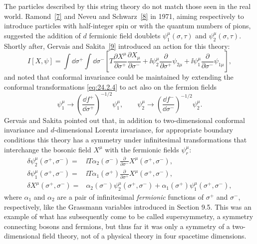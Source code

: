 The particles described by this string theory do not match those seen in the
real world. Ramond~\hyperref[ch24-ref-7]{[7]} and Neveu and
Schwarz~\hyperref[ch24-ref-8]{[8]} in 1971, aiming respectively to introduce
particles with half-integer spin or with the quantum numbers of pions,
suggested the addition of \(d\) fermionic field doublets
\(\psi_1^\mu(\sigma,\tau)\) and \(\psi_2^\mu(\sigma,\tau)\). Shortly after,
Gervais and Sakita~\hyperref[ch24-ref-9]{[9]} introduced an action for this
theory:
\begin{equation}
I[X,\psi]
=\int \dd\sigma^+\int \dd\sigma^-
\left[
T\frac{\partial X^\mu}{\partial\sigma^+}
\frac{\partial X_\mu}{\partial\sigma^-}
+\ii\psi_2^\mu\frac{\partial}{\partial\sigma^+}\psi_{2\mu}
+\ii\psi_1^\mu\frac{\partial}{\partial\sigma^-}\psi_{1\mu}
\right],
\tag{24.2.5}\label{eq:24.2.5}
\end{equation}
and noted that conformal invariance could be maintained by extending the
conformal transformations \eqref{eq:24.2.4} to act also on the fermion fields
\begin{equation}
\psi_1^\mu\longrightarrow
\left(\frac{\dd f^+}{\dd\sigma^+}\right)^{-1/2}\psi_1^\mu,
\qquad
\psi_2^\mu\longrightarrow
\left(\frac{\dd f^-}{\dd\sigma^-}\right)^{-1/2}\psi_2^\mu.
\tag{24.2.6}\label{eq:24.2.6}
\end{equation}
Gervais and Sakita pointed out that, in addition to two-dimensional conformal
invariance and \(d\)-dimensional Lorentz invariance, for appropriate boundary
conditions this theory has a symmetry under infinitesimal transformations
that interchange the bosonic field \(X^\mu\) with the fermionic fields
\(\psi_r^\mu\):
\begin{equation}
\begin{aligned}
\delta\psi_2^\mu(\sigma^+,\sigma^-)
={}&\ii T\alpha_2(\sigma^-)
\frac{\partial}{\partial\sigma^-}X^\mu(\sigma^+,\sigma^-),
\\
\delta\psi_1^\mu(\sigma^+,\sigma^-)
={}&\ii T\alpha_1(\sigma^+)
\frac{\partial}{\partial\sigma^+}X^\mu(\sigma^+,\sigma^-),
\\
\delta X^\mu(\sigma^+,\sigma^-)
={}&\alpha_2(\sigma^-)\psi_2^\mu(\sigma^+,\sigma^-)
+\alpha_1(\sigma^+)\psi_1^\mu(\sigma^+,\sigma^-),
\end{aligned}
\tag{24.2.7}\label{eq:24.2.7}
\end{equation}
where \(\alpha_1\) and \(\alpha_2\) are a pair of infinitesimal
\emph{fermionic} functions of \(\sigma^+\) and \(\sigma^-\), respectively,
like the Grassmann variables introduced in Section 9.5. This was an example
of what has subsequently come to be called supersymmetry, a symmetry
connecting bosons and fermions, but thus far it was only a symmetry of a
two-dimensional field theory, not of a physical theory in four spacetime
dimensions.

